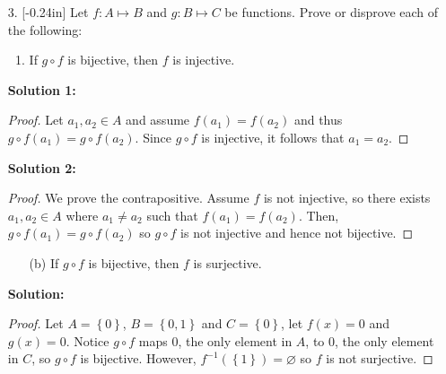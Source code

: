 \documentclass[letterpaper,12pt]{article}
\newcommand{\set}[1]{\left\{ #1 \right\}}
\theoremstyle{definition}
\begin{document}
\pagebreak
\begin{enumerate}
    \item[3. ]\reversemarginpar{}[-0.24in] Let $f: A \mapsto B$ and $g: B \mapsto C$ be functions. Prove or disprove each of the following: \begin{enumerate}
        \item If $g \circ f$ is bijective, then $f$ is injective.
    \end{enumerate}
     \begin{mdframed}
            \textbf{Solution 1:}
             \begin{proof}
            Let $a_1,a_2 \in A$ and assume $f(a_1) = f(a_2)$ and thus $g\circ f(a_1) =g\circ f(a_2)$. Since $g \circ f$ is injective, it follows that $a_1 = a_2$.
        \end{proof}
        \end{mdframed}
        \begin{mdframed}
            \textbf{Solution 2:}
             \begin{proof}
            We prove the contrapositive. Assume $f$ is not injective, so there exists $a_1,a_2 \in A$ where $a_1 \neq a_2$ such that $f(a_1) = f(a_2)$. Then, $g\circ f(a_1) = g\circ f(a_2)$ so $g\circ f$ is not injective and hence not bijective.
        \end{proof}
        \end{mdframed}
\end{enumerate}
\pagebreak
\begin{enumerate}
    \item[] \begin{enumerate}
        \item[(b)] If $g \circ f$ is bijective, then $f$ is surjective.
    \end{enumerate}
     \begin{mdframed}
            \textbf{Solution:}
            \renewcommand{\proofname}{Disproof} \begin{proof}
                Let $A = \set{0}$, $B = \set{0,1}$ and $C= \set{0}$, let $f(x) = 0$ and $g(x) = 0$. Notice $g\circ f$ maps $0$, the only element in $A$, to $0$, the only element in $C$, so $g\circ f$ is bijective. However, $f^{-1}(\set{1}) = \varnothing$ so $f$ is not surjective.
            \end{proof}
        \end{mdframed}
\end{enumerate}
\pagebreak
\end{document}
